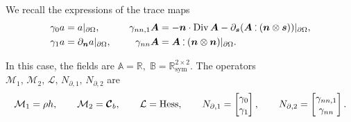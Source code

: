 We recall the expressions of the trace maps
\begin{equation}
\begin{aligned}
\gamma_{0}a &= a\vert_{\partial\Omega}, \\
\gamma_{1}a &= \partial_{\bm{n}} a \vert_{\partial\Omega},
\end{aligned}\qquad
\begin{aligned}
\gamma_{nn, 1}\bm{A} &= -\bm{n} \cdot \Div \bm{A} - \partial_{\bm{s}} (\bm{A} \cddot (\bm{n} \otimes \bm{s}))\vert_{\partial\Omega}, \\
\gamma_{nn}\bm{A} &= \bm{A} \cddot (\bm{n} \otimes \bm{n})\vert_{\partial\Omega}.
\end{aligned}
\end{equation}

In this case, the fields are $\mathbb{A}=\mathbb{R}, \;  \mathbb{B}=\mathbb{R}^{2\times 2}_{\text{sym}}$. The  operators $\mathcal{M}_1, \, \mathcal{M}_2, \, \mathcal{L}, \, N_{\partial, 1}, \, N_{\partial, 2}$ are
\begin{equation}
\mathcal{M}_1 = \rho h, \qquad 
\mathcal{M}_2 = \bm{\mathcal{C}}_b, \qquad 
\mathcal{L}= \operatorname*{Hess}, \qquad
N_{\partial, 1} = \begin{bmatrix}
\gamma_0 \\ \gamma_1
\end{bmatrix}, \qquad 
N_{\partial, 2} = \begin{bmatrix}
\gamma_{nn,1} \\ \gamma_{nn}
\end{bmatrix}.
\end{equation}

